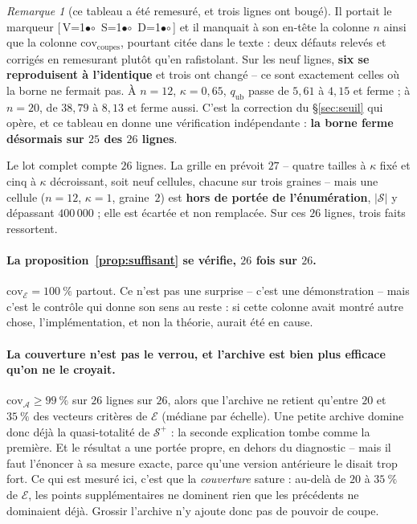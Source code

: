 \documentclass[11pt,a4paper]{article}
\theoremstyle{plain}
\theoremstyle{remark}
\newtheorem{remark}{Remarque}
\newcommand{\Ecal}{\mathcal{E}}
\newcommand{\Scal}{\mathcal{S}}
\newcommand{\Acal}{\mathcal{A}}
\newcommand{\cfgm}[1]{\ifnum#1=1$\bullet$\else$\circ$\fi}
\newcommand{\conf}[3]{%
  \textsf{\footnotesize[\,V\cfgm{#1}\ S\cfgm{#2}\ D\cfgm{#3}\,]}}
\begin{document}
\begin{remark}[ce tableau a été remesuré, et trois lignes ont bougé]
\label{rem:couvremes}
Il portait le marqueur \conf{0}{0}{0} et il manquait à son en-tête la colonne
$n$ ainsi que la colonne $\text{cov}_{\text{coupes}}$, pourtant citée dans le
texte : deux défauts relevés et corrigés en remesurant plutôt qu'en
rafistolant. Sur les neuf lignes, \textbf{six se reproduisent à l'identique}
et trois ont changé -- ce sont exactement celles où la borne ne fermait pas.
À $n=12$, $\kappa=0{,}65$, $q_{\text{ub}}$ passe de $5{,}61$ à $4{,}15$ et
ferme ; à $n=20$, de $38{,}79$ à $8{,}13$ et ferme aussi. C'est la
correction du §\ref{sec:seuil} qui opère, et ce tableau en donne une
vérification indépendante : \textbf{la borne ferme désormais sur $25$ des
$26$ lignes}.
\end{remark}

Le lot complet compte $26$ lignes. La grille en prévoit $27$ -- quatre
tailles à $\kappa$ fixé et cinq à $\kappa$ décroissant, soit neuf cellules,
chacune sur trois graines -- mais une cellule ($n=12$, $\kappa=1$,
graine~$2$) est \textbf{hors de portée de l'énumération}, $|\Scal|$ y
dépassant $400\,000$ ; elle est écartée et non remplacée. Sur ces $26$
lignes, trois faits ressortent.

\paragraph{La proposition~\ref{prop:suffisant} se vérifie, $26$ fois sur
$26$.} $\text{cov}_{\Ecal}=100\ \%$ partout. Ce n'est pas une surprise --
c'est une démonstration -- mais c'est le contrôle qui donne son sens au
reste : si cette colonne avait montré autre chose, l'implémentation, et non
la théorie, aurait été en cause.

\paragraph{La couverture n'est pas le verrou, et l'archive est bien plus
efficace qu'on ne le croyait.} $\text{cov}_{\Acal}\ge 99\ \%$ sur $26$
lignes sur $26$, alors que l'archive ne retient qu'entre $20$ et $35\ \%$
des vecteurs critères de $\Ecal$ (médiane par échelle). Une petite archive
domine donc déjà la quasi-totalité de $\Scal^{+}$ : la seconde explication
tombe comme la première. Et le résultat a une portée propre, en dehors du
diagnostic -- mais il faut l'énoncer à sa mesure exacte, parce qu'une
version antérieure le disait trop fort. Ce qui est mesuré ici, c'est que la
\emph{couverture} sature : au-delà de $20$ à $35\ \%$ de $\Ecal$, les points
supplémentaires ne dominent rien que les précédents ne dominaient déjà.
Grossir l'archive n'y ajoute donc pas de pouvoir de coupe.
\end{document}
